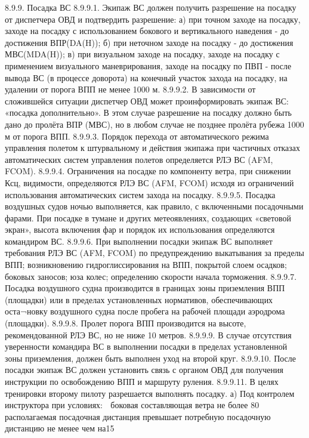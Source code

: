8.9.9.	Посадка ВС
8.9.9.1. Экипаж ВС должен получить разрешение на посадку от диспетчера ОВД и подтвердить разрешение:
а)	при точном заходе на посадку, заходе на посадку с использованием бокового и вертикального наведения - до достижения ВПР(DA(H));
б)	при неточном заходе на посадку - до достижения МВС(MDA(H));
в)	при визуальном заходе на посадку, заходе на посадку с применением визуального маневрирования, заходе на посадку по ПВП - после вывода ВС (в процессе доворота) на конечный участок захода на посадку, на удалении от порога ВПП не менее 1000 м.
8.9.9.2. В зависимости от сложившейся ситуации диспетчер ОВД может проинформировать экипаж ВС: «посадка дополнительно». В этом случае разрешение на посадку должно быть дано до пролёта ВПР (МВС), но в любом случае не позднее пролёта рубежа 1000 м от порога ВПП.
8.9.9.3. Порядок перехода от автоматического режима управления полетом к штурвальному и действия экипажа при частичных отказах автоматических систем управления полетов определяется РЛЭ ВС (AFM, FCOM).
8.9.9.4. Ограничения на посадке по компоненту ветра, при снижении Ксц, видимости, определяются РЛЭ ВС (AFM, FCOM) исходя из ограничений использования автоматических систем захода на посадку.
8.9.9.5. Посадка воздушных судов ночью выполняется, как правило, с включенными посадочными фарами. При посадке в тумане и других метеоявлениях, создающих «световой экран», высота включения фар и порядок их использования определяются командиром ВС.
8.9.9.6. При выполнении посадки экипаж ВС выполняет требования РЛЭ ВС (AFM, FCOM) по предупреждению выкатывания за пределы ВПП; возникновению гидроглиссирования на ВПП, покрытой слоем осадков; боковых заносов; юза колес; определению скорости начала торможения.
8.9.9.7. Посадка воздушного судна производится в границах зоны приземления ВПП (площадки) или в пределах установленных нормативов, обеспечивающих оста¬новку воздушного судна после пробега на рабочей площади аэродрома (площадки). 
8.9.9.8. Пролет порога ВПП производится на высоте, рекомендованной РЛЭ ВС, но не ниже 10 метров.
8.9.9.9. В случае отсутствия уверенности командира ВС в выполнении посадки в пределах установленной зоны приземления, должен быть выполнен уход на второй круг.
8.9.9.10. После посадки экипаж ВС должен установить связь с органом ОВД для получения инструкции по освобождению ВПП и маршруту руления.
8.9.9.11. В целях тренировки второму пилоту разрешается выполнять посадку.
а)	Под контролем инструктора при условиях:
	боковая составляющая ветра не более 80%
	располагаемая посадочная дистанция превышает потребную посадочную дистанцию не менее чем на15%
